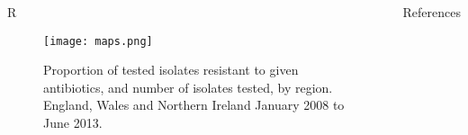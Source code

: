\documentclass[final, 14pt]{beamer}
\begin{document}
\begin{frame}
\begin{columns}[t]
\begin{minipage}[t]{.95\textwidth}
\begin{block}{\textcolor{comp_blue}{R}}
  \vfill   
   \begin{figure}
   \texttt{[image: maps.png]}
   \caption{Proportion of tested isolates resistant to given antibiotics, and number of isolates tested, by region. England, Wales and Northern Ireland January 2008 to June 2013.}
   \label{fig:maps}
   \end{figure}
  \end{block}
  \vfill
    \begin{block}{References}
   
\scriptsize{}
\vspace{.4 cm}
   \vfill
  \end{block}
\end{minipage}  

 \end{columns}

\end{frame}
\end{document}
